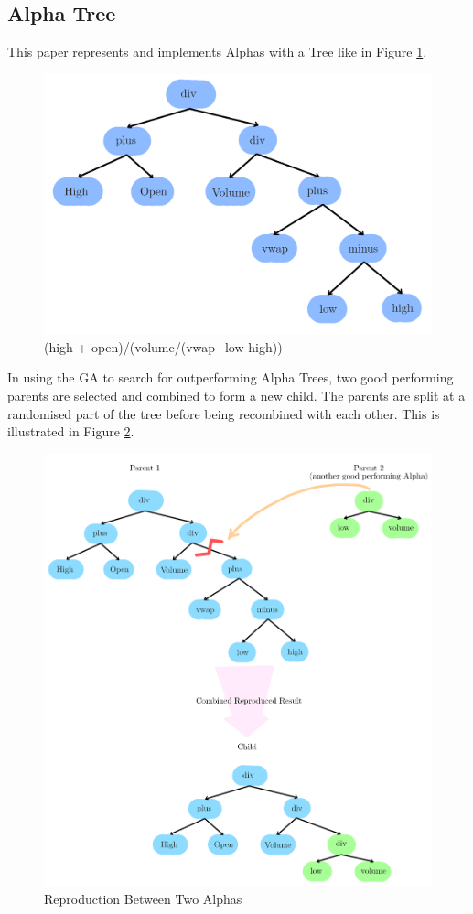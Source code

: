 \documentclass[a4paper,12pt]{report}
\numberwithin{equation}{section}
\theoremstyle{definition}
\begin{document}
\subsection{Alpha Tree}
This paper represents and implements Alphas with a Tree like in Figure \ref{fig:alpha_tree_first}. 
\begin{figure}[H]
  \centerline{\includegraphics[width=12cm]{alpha tree first}}
  \caption{(high + open)/(volume/(vwap+low-high))}
  \label{fig:alpha_tree_first}
\end{figure}
In using the GA to search for outperforming Alpha Trees, two good performing parents are selected and combined to form a new child. The parents are split at a randomised part of the tree before being recombined with each other. This is illustrated in Figure \ref{fig:alpha_tree_second}.
\begin{figure}[H]
  \centerline{\includegraphics[width=15cm]{alpha tree second}}
  \caption{Reproduction Between Two Alphas}
  \label{fig:alpha_tree_second}
\end{figure}
\end{document}
